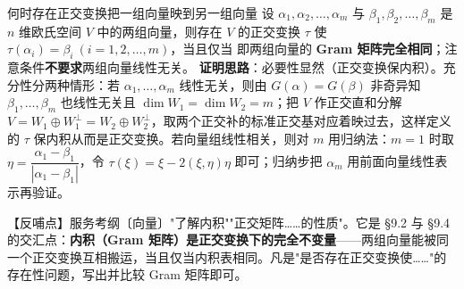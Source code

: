 \begin{fdeep}{何时存在正交变换把一组向量映到另一组向量}
设 $\alpha_{1},\alpha_{2},\dots,\alpha_{m}$ 与 $\beta_{1},\beta_{2},\dots,\beta_{m}$ 是 $n$ 维欧氏空间 $V$ 中的两组向量，则存在 $V$ 的正交变换 $\tau$ 使 $\tau(\alpha_{i})=\beta_{i}\ (i=1,2,\dots,m)$，当且仅当
即两组向量的 \textbf{Gram 矩阵完全相同}；注意条件\textbf{不要求}两组向量线性无关。
\textbf{证明思路}：必要性显然（正交变换保内积）。充分性分两种情形：若 $\alpha_{1},\dots,\alpha_{m}$ 线性无关，则由 $G(\alpha)=G(\beta)$ 非奇异知 $\beta_{1},\dots,\beta_{m}$ 也线性无关且 $\dim W_{1}=\dim W_{2}=m$；把 $V$ 作正交直和分解 $V=W_{1}\oplus W_{1}^{\perp}=W_{2}\oplus W_{2}^{\perp}$，取两个正交补的标准正交基对应着映过去，这样定义的 $\tau$ 保内积从而是正交变换。若向量组线性相关，则对 $m$ 用归纳法：$m=1$ 时取 $\eta=\dfrac{\alpha_{1}-\beta_{1}}{|\alpha_{1}-\beta_{1}|}$，令 $\tau(\xi)=\xi-2(\xi,\eta)\eta$ 即可；归纳步把 $\alpha_{m}$ 用前面向量线性表示再验证。

【反哺点】服务考纲〔向量〕"了解内积""正交矩阵……的性质"。它是 §9.2 与 §9.4 的交汇点：\textbf{内积（Gram 矩阵）是正交变换下的完全不变量}——两组向量能被同一个正交变换互相搬运，当且仅当内积表相同。凡是"是否存在正交变换使……"的存在性问题，写出并比较 Gram 矩阵即可。
\end{fdeep}


